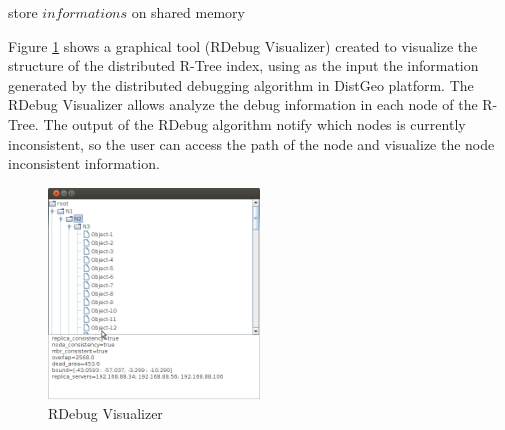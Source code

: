 \begin{center}
\begin{minipage}{1\textwidth}
\begin{algorithm2e}[H]
{    
		{
			store $informations$ on shared memory\;
		}
            
}
\caption{$RDebug(T)$ 
\label {alg:rdebug}}
\end{algorithm2e}
\end{minipage}
\end{center}


Figure \ref{fig:rdebug-vis} shows a graphical tool (RDebug Visualizer) created to visualize the structure of the distributed R-Tree index, using as the input the information generated by the distributed debugging algorithm in DistGeo platform. The RDebug Visualizer allows analyze the debug information in each node of the R-Tree. The output of the RDebug algorithm notify which nodes is currently inconsistent, so the user can access the path of the node and visualize the node inconsistent information.    

\begin{figure}[ht]
	\centering
		\includegraphics[width=0.5\textwidth]{rdebug-vis.jpg}
	\caption{RDebug Visualizer}
	\label{fig:rdebug-vis}
\end{figure}


